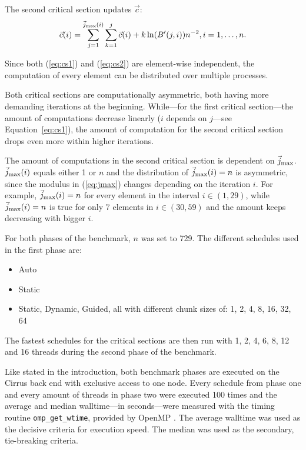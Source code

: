 \documentclass[twoside,11pt]{article}
\begin{document}
The second critical section updates $\vec{c}$:
\begin{align}
  \label{eq:cs2}
  \vec{c}(i) = \sum_{j=1}^{\vec{j}_{\text{max} }(i)}\sum_{k=1}^{j}
    \vec{c}(i) + k\ln(B'(j, i))n^{-2}, i=1,\dots,n.
\end{align}

Since both (\ref{eq:cs1}) and (\ref{eq:cs2}) are
element-wise independent, the computation of every element
can be distributed over multiple processes.

Both critical sections are computationally asymmetric, both
having more demanding iterations at the beginning.
While---for the first critical section---the amount of
computations decrease linearly ($i$ depends on $j$---see
Equation~\ref{eq:cs1}), the amount of computation for the
second critical section drops even more within higher
iterations.

The amount of computations in the second critical section
is dependent on $\vec{j}_{\text{max} }$.
$\vec{j}_{\text{max} }(i)$ equals either 1 or $n$ and the
distribution of $\vec{j}_{\text{max} }(i) = n$ is asymmetric, since
the modulus in (\ref{eq:jmax}) changes depending on the
iteration $i$.
For example, $\vec{j}_{\text{max} }(i) = n$ for every element in the
interval $i \in (1, 29)$, while $\vec{j}_{\text{max} }(i) = n$ is true for
only 7 elements in $i \in (30, 59)$ and the amount keeps
decreasing with bigger $i$.

For both phases of the benchmark, $n$ was set to 729.
The different schedules used in the first phase
are:
\begin{itemize}
  \item Auto
  \item Static
  \item Static, Dynamic, Guided, all with different
    chunk sizes of: 1, 2, 4, 8, 16, 32, 64
\end{itemize}

The fastest schedules for the critical sections
are then run with 1, 2, 4, 6, 8, 12 and 16 threads during
the second phase of the benchmark.

Like stated in the introduction, both benchmark phases are
executed on the Cirrus back end with exclusive access to
one node.
Every schedule from phase one and every amount of
threads in phase two were executed 100 times and the
average and median walltime---in seconds---were measured
with the timing routine \texttt{omp\_get\_wtime}, provided
by OpenMP \citep[see][Chapter 3.4.1]{openmp}.
The average walltime was used as the decisive criteria for
execution speed.
The median was used as the secondary, tie-breaking
criteria.
\end{document}
